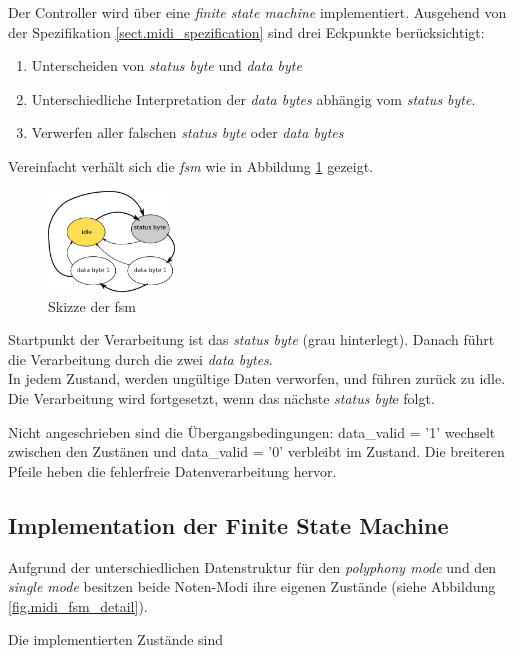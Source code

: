 Der Controller wird über eine \textit{finite state machine} implementiert. Ausgehend von der Spezifikation \ref{sect.midi_spezification} sind drei Eckpunkte berücksichtigt:
\begin{enumerate}
	\item Unterscheiden von \textit{status byte} und \textit{data byte}
	\item Unterschiedliche Interpretation der \textit{data bytes} abhängig vom \textit{status byte}.
	\item Verwerfen aller falschen \textit{status byte} oder \textit{data bytes}
\end{enumerate}
\smallskip
Vereinfacht verhält sich die \textit{fsm} wie in Abbildung \ref{fig.midi_fsm_skizze} gezeigt. 
\begin{figure}[H]
	\includegraphics[width=0.3\textwidth]{images/midi_control/fsm_grob_2.png}
	\caption{Skizze der fsm}
	\label{fig.midi_fsm_skizze}
\end{figure}

Startpunkt der Verarbeitung ist das \textit{status byte} (grau hinterlegt). Danach führt die Verarbeitung durch die zwei \textit{data bytes}.\\
In jedem Zustand, werden ungültige Daten verworfen, und führen zurück zu idle. Die Verarbeitung wird fortgesetzt, wenn das nächste \textit{status byt}e folgt.

Nicht angeschrieben sind die Übergangsbedingungen: data\_valid = '1' wechselt zwischen den Zustänen und data\_valid = '0' verbleibt im Zustand. Die breiteren Pfeile heben die fehlerfreie Datenverarbeitung hervor.

\subsection{Implementation der Finite State Machine}

Aufgrund der unterschiedlichen Datenstruktur für den \textit{polyphony mode} und den \textit{single mode} besitzen beide Noten-Modi ihre eigenen Zustände (siehe Abbildung \ref{fig.midi_fsm_detail}).

Die implementierten Zustände sind

